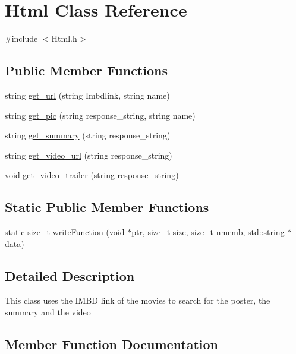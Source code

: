 \hypertarget{classHtml}{}\section{Html Class Reference}
\label{classHtml}


{\ttfamily \#include $<$Html.\+h$>$}

\subsection*{Public Member Functions}
\begin{DoxyCompactItemize}
\item 
string \hyperlink{classHtml_af19deb416237f9fac884e972f40e8e8b}{get\+\_\+url} (string Imbdlink, string name)
\item 
string \hyperlink{classHtml_a1fecec3000afdb11da16bcf956b3bcc6}{get\+\_\+pic} (string response\+\_\+string, string name)
\item 
string \hyperlink{classHtml_ac2127449a2206dd13c3afc49d1309a3d}{get\+\_\+summary} (string response\+\_\+string)
\item 
string \hyperlink{classHtml_a64b0ceb41fe7a760a6fbea7db58232fa}{get\+\_\+video\+\_\+url} (string response\+\_\+string)
\item 
void \hyperlink{classHtml_ad67363a1fdd7087ff74b1d20e12bd157}{get\+\_\+video\+\_\+trailer} (string response\+\_\+string)
\end{DoxyCompactItemize}
\subsection*{Static Public Member Functions}
\begin{DoxyCompactItemize}
\item 
static size\+\_\+t \hyperlink{classHtml_a08bdc1d0e3fc60c4d12304e0dad1c302}{write\+Function} (void $\ast$ptr, size\+\_\+t size, size\+\_\+t nmemb, std\+::string $\ast$data)
\end{DoxyCompactItemize}


\subsection{Detailed Description}
This class uses the I\+M\+BD link of the movies to search for the poster, the summary and the video 

\subsection{Member Function Documentation}
\mbox{\label{classHtml_a1fecec3000afdb11da16bcf956b3bcc6}} 
